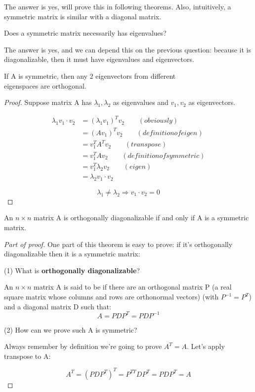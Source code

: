 The answer is yes, will prove this in following theorems. Also, intuitively, a symmetric matrix is similar with a diagonal matrix.

\begin{remark}
    Does a symmetric matrix necessarily has eigenvalues?
\end{remark}

The answer is yes, and we can depend this on the previous question: because it is diagonalizable, then it must have eigenvalues and eigenvectors.

\begin{theorem}\label{theorem: 7.1.1}
    If A is symmetric, then any 2 eigenvectors from different \\ eigenspaces are orthogonal.
\end{theorem}

\begin{proof}
    Suppose matrix A has $\lambda_1, \lambda_2$ as eigenvalues and $v_1, v_2$ as eigenvectors.

    \begin{align*}
        \lambda_1v_1 \cdot v_2 & = (\lambda_1 v_1)^{T} v_2 \qquad(obviously)\\
        & = (Av_1)^T v_2 \qquad(definition of eigen)  \\
        & = v_1^T A^T v_2 \qquad(transpose) \\
        & = v_1^T A v_2 \qquad(definition of symmetric) \\
        & = v_1^T \lambda_2 v_2 \qquad(eigen) \\
        & = \lambda_2 v_1 \cdot v_2
    \end{align*}

    $$\lambda_1 \neq \lambda_2 \Rightarrow v_1 \cdot v_2 = 0$$
\end{proof}

\begin{theorem}\label{theorem: 7.1.2}
    An $n \times n$ matrix A is orthogonally diagonalizable if and only if A is a symmetric matrix.
\end{theorem}

\begin{proof}[Part of proof]
One part of this theorem is easy to prove: if it's orthogonally diagonalizable then it is a symmetric matrix:

(1) What is \textbf{orthogonally diagonalizable}?

An $n \times n$ matrix A is said to be  if there are an orthogonal matrix P (a real square matrix whose columns and rows are orthonormal vectors) (with $P^{-1} = P^T$) and a diagonal matrix D such that:
$$A = PDP^T = PDP^{-1}$$

(2) How can we prove such A is symmetric?

Always remember by definition we're going to prove $A^T = A$. Let's apply transpose to A:

$$A^T = (PDP^T)^T = P^{TT}DP^T = PDP^T = A$$
\end{proof}

